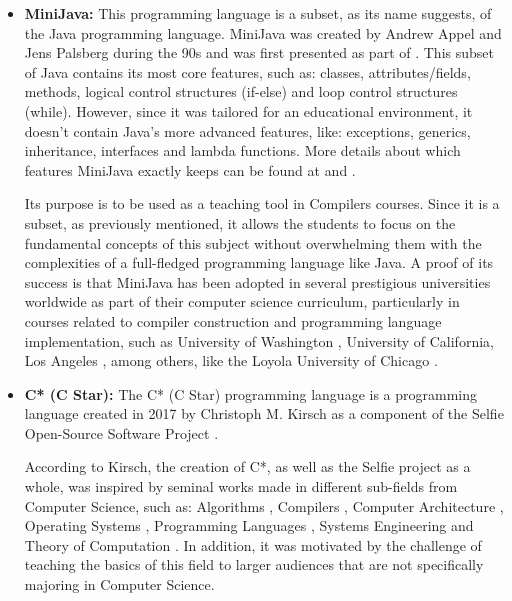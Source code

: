 \begin{itemize}
    \item \textbf{MiniJava:} This programming language \cite{cambridge_minijava_project} is a subset, as its name suggests, of the Java programming language. MiniJava was created by Andrew Appel and Jens Palsberg during the 90s and was first presented as part of \cite{appel2002modernCompilerImplementationJava}. This subset of Java contains its most core features, such as: classes, attributes/fields, methods, logical control structures (if-else) and loop control structures (while). However, since it was tailored for an educational environment, it doesn't contain Java's more advanced features, like: exceptions, generics, inheritance, interfaces and lambda functions. More details about which features MiniJava exactly keeps can be found at \cite{cambridge_minijava_project} and \cite{cambridge_minijava_grammar}.
        
    Its purpose is to be used as a teaching tool in Compilers courses. Since it is a subset, as previously mentioned, it allows the students to focus on the fundamental concepts of this subject without overwhelming them with the complexities of a full-fledged programming language like Java.
    A proof of its success is that MiniJava has been adopted in several prestigious universities worldwide as part of their computer science curriculum, particularly in courses related to compiler construction and programming language implementation, such as University of Washington \cite{university_of_washington_cs_compiler_construction_course_page_2024}, University of California, Los Angeles \cite{ucla_cs_compiler_construction_course_page_fall_2012}, among others, like the Loyola University of Chicago \cite{loyola_university_of_chicago_cs_compiler_construction_course_page_fall_2018}.     
    
    \item \textbf{C* (C Star):} The C* (C Star) programming language \cite{kirsch2017selfie} is a programming language created in 2017 by Christoph M. Kirsch as a component of the Selfie Open-Source Software Project \cite{selfie_official_website} \cite{selfie_official_repo_github}.

    According to Kirsch, the creation of C*, as well as the Selfie project as a whole, was inspired by seminal works made in different sub-fields from Computer Science, such as: Algorithms \cite{knuth2011art} \cite{wirth1976algorithms}, Compilers \cite{wirth1996compiler}, Computer Architecture \cite{hennessy2011computer}, Operating Systems \cite{liedtke1996toward}, Programming Languages \cite{kernighan1988c} \cite{richards2009bcpl}, Systems Engineering \cite{dijkstra1968structure} \cite{goldberg1983smalltalk} \cite{nisan2005elements} \cite{sussman1996structure} and Theory of Computation \cite{sipser1996introduction}. In addition, it was motivated by the challenge of teaching the basics of this field to larger audiences that are not specifically majoring in Computer Science.


\end{itemize}
